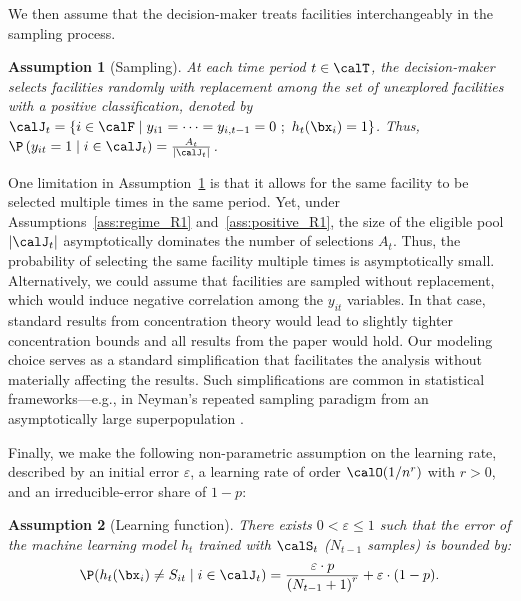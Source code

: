 \documentclass[11pt]{article}
\newtheorem{assumption}{Assumption}[]
\begin{document}
We then assume that the decision-maker treats facilities interchangeably in the sampling process.

\begin{assumption}[Sampling]\label{ass:sampling_R1}
    At each time period $t\in\calT$, the decision-maker selects facilities randomly with replacement among the set of unexplored facilities with a positive classification, denoted by $\calJ_t=\{i\in\calF\mid y_{i1}=\cdots=y_{i,t-1}=0\ ;\ h_t(\bx_{i})=1\}$. Thus, $\P\left(y_{it}=1 \mid i \in \calJ_t\right)= 
    \frac{A_t}{|\calJ_t|}$.
\end{assumption}

One limitation in Assumption~\ref{ass:sampling_R1} is that it allows for the same facility to be selected multiple times in the same period. Yet, under Assumptions~\ref{ass:regime_R1} and~\ref{ass:positive_R1}, the size of the eligible pool $|\calJ_t|$ asymptotically dominates the number of selections $A_t$. Thus, the probability of selecting the same facility multiple times is asymptotically small. Alternatively, we could assume that facilities are sampled without replacement, which would induce negative correlation among the $y_{it}$ variables. In that case, standard results from concentration theory \citep{serfling1974probability} would lead to slightly tighter concentration bounds and all results from the paper would hold. Our modeling choice serves as a standard simplification that facilitates the analysis without materially affecting the results. Such simplifications are common in statistical frameworks—e.g., in Neyman's repeated sampling paradigm from an asymptotically large superpopulation \citep{Neyman1934,SarndalSwenssonWretman1992}.

Finally, we make the following non-parametric assumption on the learning rate, described by an initial error $\varepsilon$, a learning rate of order $\calO(1/n^{r})$ with $r>0$, and an irreducible-error share of $1-p$:
\begin{assumption}[Learning function] \label{ass:classification_R1}
    There exists $0<\varepsilon\leq 1$ such that the error of the machine learning model $h_t$ trained with $\calS_t$ ($N_{t-1}$ samples) is bounded by:
    \begin{align*}
        \P(h_t(\bx_{i})\neq S_{it} \mid i \in \calJ_t)=\frac{\varepsilon\cdot p}{\left(N_{t-1} + 1\right)^r}+\varepsilon\cdot(1-p).
    \end{align*}
\end{assumption}
\end{document}
